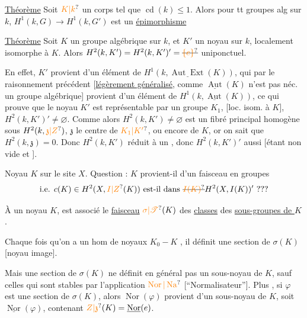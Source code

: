 \uline{Théorème} Soit $\unsure{K|k}$ un corps tel que $\operatorname{cd}(k)\leq1$. Alors pour tt   groupes alg sur $k$, $H^1(k,G)\longrightarrow H^1(k,G')$ est un \uline{épimorphisme}

\uline{Théorème}  Soit $K$ un groupe algébrique sur $k$, et $K'$ un noyau sur $k$, localement isomorphe à $K$. Alors $H^2(k,K')=H^2(k,K')'=\deleted{\unsure{\{e\}}}$ uniponctuel.

En effet, $K'$ provient d'un élément de $H^1(k,\underline{\operatorname{Aut}\operatorname{Ext}}(K))$, qui par le raisonnement précédent [\uline{légèrement généralisé}, comme $\underline{\operatorname{Aut}}(K)$ n'est pas néc. un groupe algébrique\unsure{\ldots}] provient d'un élément de $H^1(k,\underline{\operatorname{Aut}}(K))$, ce qui prouve que le noyau $K'$ est représentable par un groupe $K_1$, [loc. isom. à $K$],    $H^2(k,K')'\ne\varnothing$. Comme alors $H^2(k,K')\ne\varnothing$ est un fibré principal homogène sous $H^2(k,\unsure{\mathfrak{z}|Z})$, $\mathfrak{z}$ le centre de $\unsure{K_1|K'}$, ou encore de $K$, or on sait que $H^2(k,\mathfrak{z})=0$. Donc $H^2(k,K')$ réduit à un , donc $H^2(k,K')'$ aussi [étant non vide et ].

Noyau $K$ sur le site $X$. Question : $K$ provient-il d'un faisceau en groupes
\[
\text{i.e. }c(K)\in H^2(X,\unsure{I|Z}(K))\text{ est-il dans }\deleted{\unsure{I(K)}}H^2(X,I(K))'\text{ ???}
\]


À un noyau $K$, est associé le \uline{faisceau} $\unsure{\sigma|\mathscr{T}}(K)$ des \uline{classes} des \uline{sous-groupes de $K$}. 

Chaque fois qu'on a un hom de noyaux $K_0-K$ , il définit une section de $\sigma(K)$ [noyau image].

 Mais une section de $\sigma(K)$ ne définit en général pas un sous-noyau de $K$, sauf celles qui sont stables par l'application $\unsure{\operatorname{Nor}|\operatorname{Na}}$ [``Normalisateur'']. Plus , si $\varphi$ est une section de $\sigma(K)$, alors $\operatorname{Nor}(\varphi)$ provient d'un sous-noyau de $K$, soit $\underline{\operatorname{Nor}}(\varphi)$, contenant $\unsure{Z|\mathfrak{z}}(K)=\underline{\operatorname{Nor}}(e)$.


